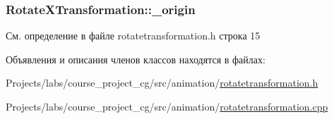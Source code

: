 \subsubsection[{\texorpdfstring{\+\_\+origin}{_origin}}]{ Rotate\+X\+Transformation\+::\+\_\+origin\hspace{0.3cm}{\ttfamily [protected]}}\hypertarget{class_rotate_x_transformation_a771b16f30e12e307d6fa352f0aeca526}{}\label{class_rotate_x_transformation_a771b16f30e12e307d6fa352f0aeca526}


См. определение в файле rotatetransformation.\+h строка 15



Объявления и описания членов классов находятся в файлах\+:\begin{DoxyCompactItemize}
\item 
Projects/labs/course\+\_\+project\+\_\+cg/src/animation/\hyperlink{rotatetransformation_8h}{rotatetransformation.\+h}\item 
Projects/labs/course\+\_\+project\+\_\+cg/src/animation/\hyperlink{rotatetransformation_8cpp}{rotatetransformation.\+cpp}\end{DoxyCompactItemize}
